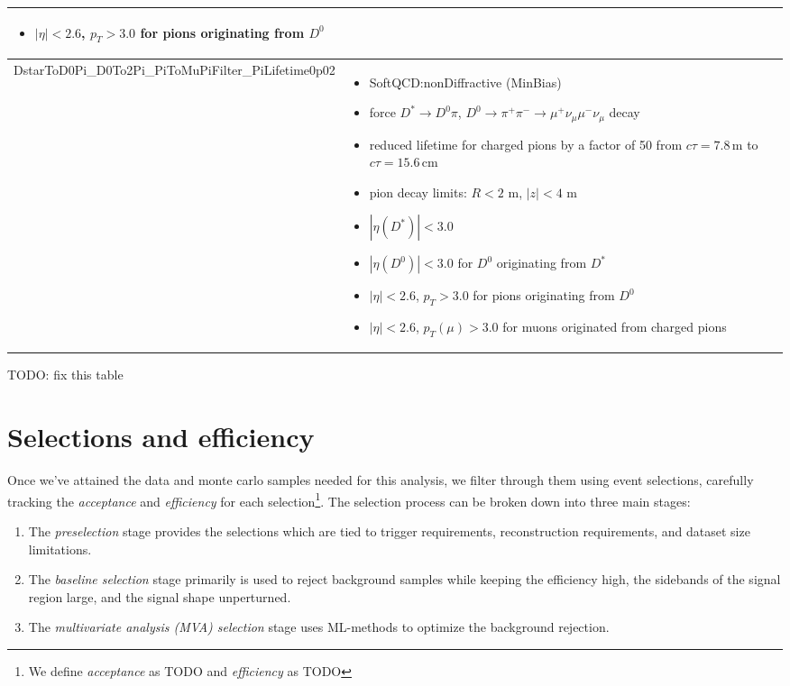 \begin{tabularx}{\textwidth}{|l|X|}
\begin{itemize}
      \item $|\eta| < 2.6$, $p_T > 3.0$ for pions originating from $D^0$
    \end{itemize} \\
    \hline
    DstarToD0Pi\_D0To2Pi\_PiToMuPiFilter\_PiLifetime0p02 &
    \begin{itemize}
      \item SoftQCD:nonDiffractive (MinBias)
      \item force $D^* \to D^0\pi$, $D^0 \to \pi^+\pi^- \to \mu^+\nu_\mu\mu^-\nu_\mu$ decay
      \item reduced lifetime for charged pions by a factor of 50 from $c\tau = 7.8\,\text{m}$ to $c\tau = 15.6\,\text{cm}$
      \item pion decay limits: $R < 2$ m, $|z| < 4$ m
      \item $|\eta(D^*)| < 3.0$
      \item $|\eta(D^0)| < 3.0$ for $D^0$ originating from $D^*$
      \item $|\eta| < 2.6$, $p_T > 3.0$ for pions originating from $D^0$
      \item $|\eta| < 2.6$, $p_T(\mu) > 3.0$ for muons originated from charged pions
    \end{itemize} \\
    \hline
\end{tabularx}

TODO: fix this table

\section{Selections and efficiency}

Once we've attained the data and monte carlo samples needed for this analysis, we filter through them using event selections, carefully tracking the \textit{acceptance} and \textit{efficiency} for each selection\footnote{We define \textit{acceptance} as TODO and \textit{efficiency} as TODO}. The selection process can be broken down into three main stages:
\begin{enumerate}
    \item The \textit{preselection} stage provides the selections which are tied to trigger requirements, reconstruction requirements, and dataset size limitations.
    \item The \textit{baseline selection} stage primarily is used to reject background samples while keeping the efficiency high, the sidebands of the signal region large, and the signal shape unperturned. 
    \item The \textit{multivariate analysis (MVA) selection} stage uses ML-methods to optimize the background rejection.
\end{enumerate}

